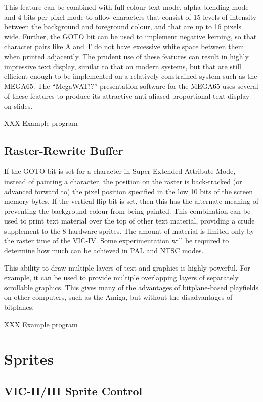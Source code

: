 This feature can be combined with full-colour text mode, alpha blending mode and 4-bits per pixel mode to allow characters that consist of
15 levels of intensity between the background and foreground colour, and that are up to 16 pixels wide.  Further, the GOTO bit can be used to implement negative kerning, so that character pairs like A and T do not have excessive white space between them when printed adjacently. The prudent use of these features can result in highly impressive text display, similar to that on modern systems, but that are still efficient enough to be implemented on a relatively constrained system such as the MEGA65. The ``MegaWAT!?'' presentation software for the MEGA65 uses several of these features to produce its attractive anti-aliased proportional text display on slides.

XXX Example program

\subsection{Raster-Rewrite Buffer}

If the GOTO bit is set for a character in Super-Extended Attribute Mode, instead of painting a character, the position on the raster is back-tracked (or advanced forward to) the
pixel position specified in the low 10 bits of the screen memory bytes.  If the vertical flip bit is set, then this has the alternate
meaning of preventing the background colour from being painted.  This combination can be used to print text material over the top of
other text material, providing a crude supplement to the 8 hardware sprites.  The amount of material is limited only by the raster
time of the VIC-IV. Some experimentation will be required to determine how much can be achieved in PAL and NTSC modes.

This ability to draw multiple layers of text and graphics is highly powerful. For example, it can be used to provide multiple overlapping
layers of separately scrollable graphics.  This gives many of the advantages of bitplane-based playfields on other computers, such as the
Amiga, but without the disadvantages of bitplanes.

XXX Example program

\section{Sprites}

\subsection{VIC-II/III Sprite Control}

